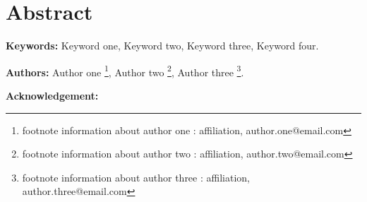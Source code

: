 \documentclass[Theme1]{{template_material/eurostat}}
\begin{document}

\newpage \thispagestyle{empty} \mbox{} 
\newpage 

\newpage

\pagestyle{numstyle} %
\renewcommand{\sectionmark}[1]{\markboth{#1}{}} %
\newpage
{} %
\section*{Abstract}

\lipsum[1-2] %

\textbf{Keywords: } Keyword one, Keyword two, Keyword three, Keyword four.

\textbf{Authors: } Author one \footnote{footnote information about author one : affiliation, author.one@email.com}, Author two \footnote{footnote information about author two : affiliation, author.two@email.com}, Author three \footnote{footnote information about author three : affiliation,  author.three@email.com}.

\textbf{Acknowledgement: } \lipsum[1-1]


\newpage %

\begingroup
\renewcommand*\contentsname{Table of contents}
\setlength{\parskip}{4pt}
\renewcommand{\cftsecfont}{\bfseries\fontsize{11pt}{8pt}\selectfont}
\renewcommand{\cftsubsecfont}{\bfseries}

\renewcommand{\cftdotsep}{0.5}
\renewcommand{\cftsecleader}{\bfseries\fontsize{11pt}{8pt}\cftdotfill{\cftdotsep}}
\renewcommand{\cftsubsecleader}{\bfseries\cftdotfill{\cftdotsep}}

\tableofcontents

\endgroup
\newpage %
\end{document}
